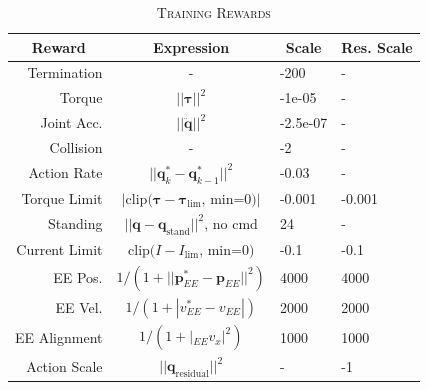 \begin{table}[ht]
\caption{\textsc{Training Rewards}} \label{tab:rewards}
\centering
\begin{tabular}{rcll}
\hline
\multicolumn{1}{c}{Reward} & Expression & \multicolumn{1}{c}{Scale} & \multicolumn{1}{c}{Res. Scale} \\ \hline
Termination                & -          & -200                                  & -                                         \\
Torque                     &   $||\bm{\tau}||^2$        & -1e-05                                & -                                         \\
Joint Acc.                 &    $||\ddot{\textbf{q}}||^2$        & -2.5e-07                             & -                                         \\
Collision                  &    -        & -2                                    & -                                         \\
Action Rate                &    $||\textbf{q}^*_k-\textbf{q}^*_{k-1}||^2$        & -0.03                                 & -                                         \\
Torque Limit               &    $|\text{clip(}\bm{\tau}-\bm{\tau}_{\text{lim}}\text{, min=0)}|$        & -0.001                                & -0.001                                    \\
Standing                   &    $||\textbf{q}-\textbf{q}_\text{stand}||^2$, no cmd        & 24                                    & -                                         \\
Current Limit              &    $\text{clip(}I-I_{\text{lim}}\text{, min=0)}$        & -0.1                                  & -0.1                                      \\
EE Pos.           &    ${1}/{(1+||\bm{p}_{EE}^*-\bm{p}_{EE}||^2)}$        & 4000                                  & 4000                                      \\
EE Vel.           &   ${1}/{(1+|v_{EE}^*-v_{EE}|)}$         & 2000                                  & 2000                                      \\
EE Alignment    &     ${1}/{(1+|_{EE}v_x|^2)}$       & 1000                                  & 1000                                      \\
Action Scale               &    $||{\textbf{q}_\text{residual}}||^2$        & -                                     & -1                                        \\ \hline
\end{tabular}
\end{table}